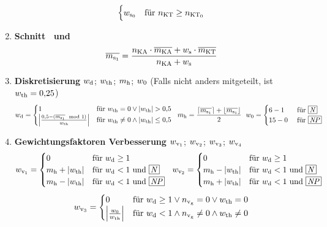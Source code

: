 \begin{enumerate}[label=\textbf{(\arabic*)}, align=left, leftmargin=*]
\[\begin{cases}
		w_{\mathrm{s}_0} & \text{für }    n_{\mathrm{KT}} \geq n_{\mathrm{KT}_0} \\
	\end{cases}
	\]	
	\item \textbf{Schnitt ~und } \vspace{-0.5cm}
	\[
	\overline{m_{\mathrm{s}_1}} = \frac{ n_{\mathrm{KA}} \cdot \overline{m_{\mathrm{KA}}} + w_{\mathrm{s}} \cdot \overline{m_{\mathrm{KT}}} }{n_{\mathrm{KA}} + w_{\mathrm{s}}}
	\]
	\item \textbf{Diskretisierung} $w_{\mathrm{d}}$; $w_{\mathrm{th}}$; $m_{\mathrm{h}}$; $w_{0}$ (Falls nicht anders mitgeteilt, ist $w_{\mathrm{th}}=0{,}25$) \cite{wikigaussklammer,wikibetrag,wikimodulo}
	\[
	\wdis = 
	\begin{cases}
		1 & \text{für }  \wth = 0 \lor \left | \wth \right | > 0{,}5\\
		\left| \frac{0{,}5 - (\mseins \mod 1)}{\wth} \right| & \text{für } \wth \neq 0 \land  \left | \wth \right | \leq 0{,}5
	\end{cases}
	\,\hspace{0.1cm}\,
	\mhalf = \frac{\lceil \mseins \rceil + \lfloor \mseins \rfloor}{2}
	\,\hspace{0.1cm}\,
	\wnull =
	\begin{cases}
		6-1 & \text{ für \defsn} \\
		15 - 0 & \text{ für \defsnp} \\
	\end{cases}
	\]
	\item \textbf{Gewichtungsfaktoren Verbesserung} $w_{\mathrm{v}_1}$; $w_{\mathrm{v}_2}$; $w_{\mathrm{v}_3}$; $w_{\mathrm{v}_4}$ \cite{wikilog}
	\[
	\wveins =
	\begin{cases}
		0 & \text{für }  \wdis \geq 1 \\
		\mhalf + \left | \wth \right | & \text{für }    \wdis < 1 \text{ und \defsn} \\
		\mhalf - \left | \wth \right |& \text{für }    \wdis < 1 \text{ und \defsnp} \\
	\end{cases}
	\,\,\,\,
	\wvzwei =
	\begin{cases}
		0 & \text{für }  \wdis \geq 1 \\
		\mhalf - \left | \wth \right | & \text{für }    \wdis < 1 \text{ und \defsn} \\
		\mhalf + \left | \wth \right | & \text{für }    \wdis < 1 \text{ und \defsnp} \\
	\end{cases}
	\]
	\[
	w_{\mathrm{v}_3} =
	\begin{cases}
		0 & \text{für } w_{\mathrm{d}} \geq 1 \lor n_{\mathrm{v}_\mathrm{g}}=0 \lor w_{\mathrm{th}} = 0\\
		\left | \frac{w_{0}}{w_{\mathrm{th}}}  \right | & \text{für } w_{\mathrm{d}} < 1 \land n_{\mathrm{v}_\mathrm{g}} \neq 0 \land  w_{\mathrm{th}} \neq 0\\

\end{cases}\]
\end{enumerate}
